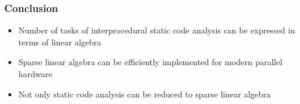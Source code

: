 \documentclass[xcolor=table]{beamer}
\begin{document}
\begin{frame}[fragile] \frametitle{Conclusion}
  \begin{itemize}
    \item Number of tasks of interprocedural static code analysis can be expressed in terms of linear algebra
    \item Sparse linear algebra can be efficiently implemented for modern parallel hardware
    \item Not only static code analysis can be reduced to sparse linear algebra
  \end{itemize}
\end{frame}
\end{document}
